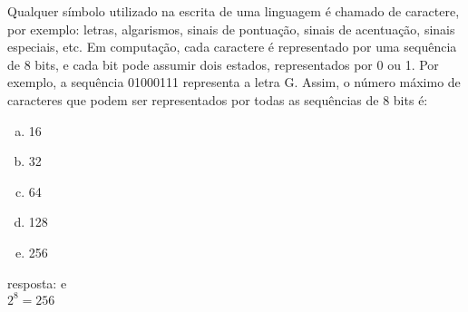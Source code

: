 \begin{ex}
Qualquer símbolo utilizado na escrita de uma linguagem é chamado de caractere, por exemplo: letras, algarismos, sinais de pontuação, sinais de acentuação, sinais especiais, etc. Em computação, cada caractere é representado por uma sequência de 8 bits, e cada bit pode assumir dois estados, representados por 0 ou 1. Por exemplo, a sequência 01000111 representa a letra G. Assim, o número máximo de caracteres que podem ser representados por todas as sequências de 8 bits é:
   \begin{enumerate}[(a)]
   \item 16
   \item 32
   \item 64
   \item 128
   \item 256
   \end{enumerate}
     \begin{sol}
       resposta: e \\
       $2^8=256$
     \end{sol}
\end{ex}